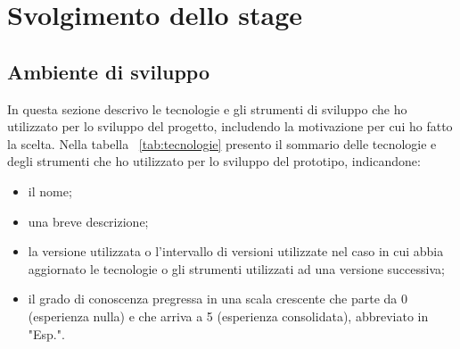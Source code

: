 
\pagebreak
\chapter{Svolgimento dello stage}
\label{cap:descrizione-stage}

\section{Ambiente di sviluppo}

In questa sezione descrivo le tecnologie e gli strumenti di sviluppo che ho utilizzato per lo sviluppo del progetto, includendo la motivazione per cui ho fatto la scelta.
Nella tabella ~\ref{tab:tecnologie} presento il sommario delle tecnologie e degli strumenti che ho utilizzato per lo sviluppo del prototipo, indicandone:
\begin{itemize}
  \item il nome;
  \item una breve descrizione;
  \item la versione utilizzata o l'intervallo di versioni utilizzate nel caso in cui abbia aggiornato le tecnologie o gli strumenti utilizzati ad una versione successiva;
  \item il grado di conoscenza pregressa in una scala crescente che parte da 0 (esperienza nulla) e che arriva a 5 (esperienza consolidata), abbreviato in "Esp.".
\end{itemize}

